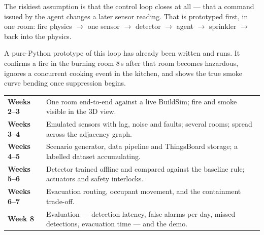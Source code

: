 The riskiest assumption is that the control loop closes at all --- that a command
issued by the agent changes a later sensor reading. That is prototyped first, in
one room: fire physics $\rightarrow$ one sensor $\rightarrow$ detector
$\rightarrow$ agent $\rightarrow$ sprinkler $\rightarrow$ back into the physics.

A pure-Python prototype of this loop has already been written and runs. It
confirms a fire in the burning room 8\,s after that room becomes hazardous,
ignores a concurrent cooking event in the kitchen, and shows the true smoke curve
bending once suppression begins.

\begin{center}
\begin{tabular}{>{\bfseries}l p{9.6cm}}
\toprule
Weeks 2--3 & One room end-to-end against a live BuildSim; fire and smoke visible
             in the 3D view. \\
Weeks 3--4 & Emulated sensors with lag, noise and faults; several rooms; spread
             across the adjacency graph. \\
Weeks 4--5 & Scenario generator, data pipeline and ThingsBoard storage; a
             labelled dataset accumulating. \\
Weeks 5--6 & Detector trained offline and compared against the baseline rule;
             actuators and safety interlocks. \\
Weeks 6--7 & Evacuation routing, occupant movement, and the containment
             trade-off. \\
Week 8     & Evaluation --- detection latency, false alarms per day, missed
             detections, evacuation time --- and the demo. \\
\bottomrule
\end{tabular}
\end{center}
